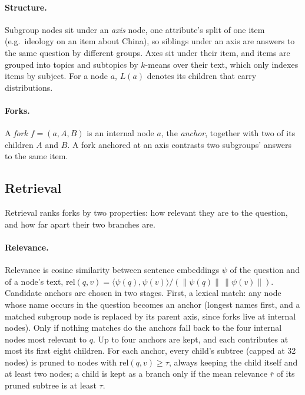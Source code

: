 \documentclass[11pt]{article}
\begin{document}
\paragraph{Structure.}
Subgroup nodes sit under an \emph{axis} node, one attribute's split of one item
(e.g.\ ideology on an item about China), so siblings under an axis are answers
to the same question by different groups. Axes sit under their item, and items
are grouped into topics and subtopics by $k$-means over their text, which only
indexes items by subject. For a node $a$, $L(a)$ denotes its children that
carry distributions.

\paragraph{Forks.}
A \emph{fork} $f = (a, A, B)$ is an internal node $a$, the \emph{anchor},
together with two of its children $A$ and $B$. A fork anchored at an axis
contrasts two subgroups' answers to the same item.

\subsection{Retrieval}
\label{sec:retrieval}

Retrieval ranks forks by two properties: how relevant they are to the question,
and how far apart their two branches are.

\paragraph{Relevance.}
Relevance is cosine similarity between sentence embeddings $\psi$ of the
question and of a node's text,
$\mathrm{rel}(q, v) = \langle \psi(q), \psi(v) \rangle / (\lVert\psi(q)\rVert\,\lVert\psi(v)\rVert)$.
Candidate anchors are chosen in two stages. First, a lexical match: any node
whose name occurs in the question becomes an anchor (longest names first, and a
matched subgroup node is replaced by its parent axis, since forks live at
internal nodes). Only if nothing matches do the anchors fall back to the four
internal nodes most relevant to $q$. Up to four anchors are kept, and each
contributes at most its first eight children. For each anchor, every child's
subtree (capped at 32 nodes) is pruned to nodes with
$\mathrm{rel}(q, v) \ge \tau$, always keeping the child itself and at least two
nodes; a child is kept as a branch only if the mean relevance $\bar r$ of its
pruned subtree is at least $\tau$.
\end{document}
